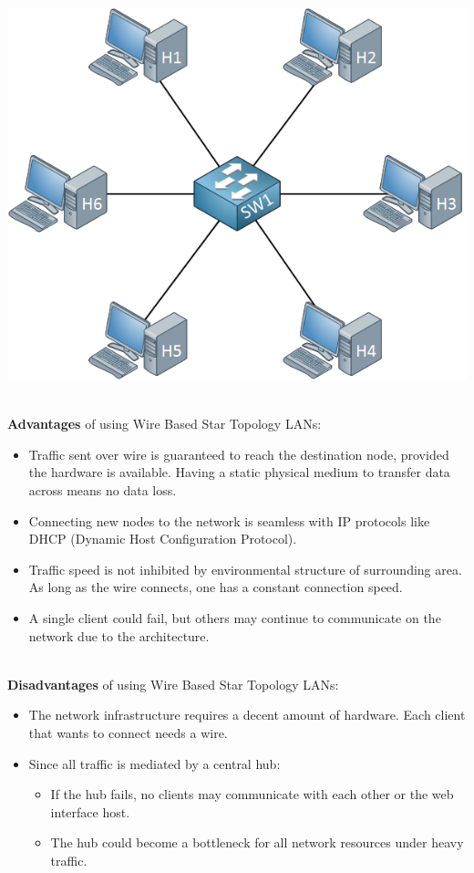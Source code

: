 	\begin{center}
		\includegraphics[scale=0.5]{techreview/switch-star-topology-hosts.png}
	\end{center} \cite{IMG1}

	\newpage %

	\noindent \\ \textbf{Advantages} of using Wire Based Star Topology LANs:
	\begin{itemize}
		\item Traffic sent over wire is guaranteed to reach the destination node, provided the hardware is available.  Having a static physical medium to transfer data across means no data loss.
		\item Connecting new nodes to the network is seamless with IP protocols like DHCP (Dynamic Host Configuration Protocol).
		\item Traffic speed is not inhibited by environmental structure of surrounding area.  As long as the wire connects, one has a constant connection speed.
		\item A single client could fail, but others may continue to communicate on the network due to the architecture.
	\end{itemize}

	\noindent \\ \textbf{Disadvantages} of using Wire Based Star Topology LANs:
	\begin{itemize}
		\item The network infrastructure requires a decent amount of hardware.  Each client that wants to connect needs a wire.
		\item Since all traffic is mediated by a central hub:
		\begin{itemize}
			\item If the hub fails, no clients may communicate with each other or the web interface host.
			\item The hub could become a bottleneck for all network resources under heavy traffic.
		\end{itemize}
	\end{itemize}

